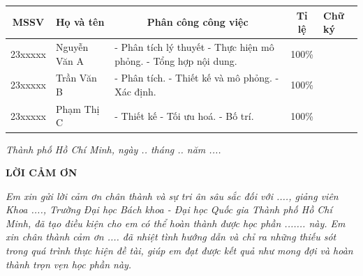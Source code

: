 \documentclass[12pt, a4paper, oneside]{article}
\begin{document}
\vspace{0.5cm}

\begin{table}[H] %
    \centering
    \renewcommand{\arraystretch}{1.8}
    \renewcommand{\tabularxcolumn}[1]{m{#1}} %
    \begin{tabularx}{\textwidth}{|c|l|X|c|>{\centering\arraybackslash}m{2.5cm}|}
        \hline
        \textbf{MSSV} & \textbf{Họ và tên} & \multicolumn{1}{c|}{\textbf{Phân công công việc}} & \textbf{Tỉ lệ} & \textbf{Chữ ký} \\
        \hline
        23xxxxx & Nguyễn Văn A & 
        - Phân tích lý thuyết \newline
        - Thực hiện mô phỏng. \newline
        - Tổng hợp nội dung. & 
        100\% & 
         \\
        \hline
        23xxxxx & Trần Văn B & 
        - Phân tích. \newline
        - Thiết kế và mô phỏng. \newline
        - Xác định. & 
        100\% & 
         \\
        \hline
        23xxxxx & Phạm Thị C & 
        - Thiết kế \newline
        - Tối ưu hoá. \newline
        - Bố trí. & 
        100\% & 
         \\
        \hline
    \end{tabularx}
\end{table}

\vspace{1cm}
\begin{flushright}
    \textit{Thành phố Hồ Chí Minh, ngày .. tháng .. năm ....}
\end{flushright}





\newpage
\thispagestyle{empty}
\begin{center}
    \textbf{LỜI CẢM ƠN}
\end{center}

\textit{Em xin gửi lời cảm ơn chân thành và sự tri ân sâu sắc đối với ...., giảng viên Khoa ...., Trường Đại học Bách khoa - Đại học Quốc gia Thành phố Hồ Chí Minh, đã tạo điều kiện cho em có thể hoàn thành được học phần ....... này. Em xin chân thành cảm ơn .... đã nhiệt tình hướng dẫn và chỉ ra những thiếu sót trong quá trình thực hiện đề tài, giúp em đạt được kết quả như mong đợi và hoàn thành trọn vẹn học phần này.}
\end{document}
